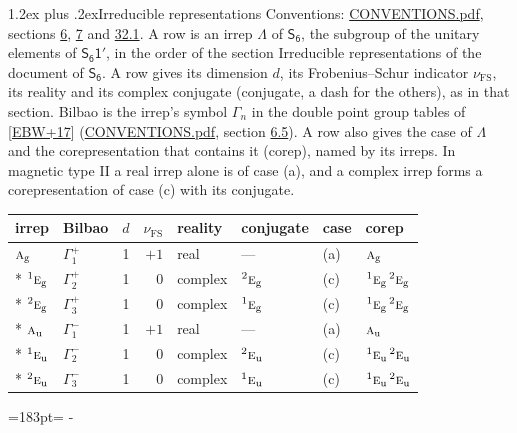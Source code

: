 \documentclass[10pt,a4paper]{article}
\makeatletter
\renewcommand\section{\@startsection{section}{1}{\z@}{-3ex plus -1ex minus -.2ex}%
  {1.2ex plus .2ex}{\normalfont\large\sffamily\bfseries\color{parttitle}}}
\newcommand{\needspace}[1]{\par\penalty-100\begingroup\dimen0=#1\relax\dimen2=\pagegoal
  \advance\dimen2-\pagetotal\ifdim\dimen0>\dimen2\relax\ifdim\dimen2>0pt\vfil\break\fi\fi
  \endgroup}
\numberwithin{equation}{section}
\newcommand{\grp}[1]{\mathsf{#1}}
\newcommand{\irr}[1]{\text{\normalfont\scshape #1}}
\newcommand{\conjpair}[1]{{}^{#1}}
\newcommand{\ptag}[1]{\mathrm{#1}}
\newcommand{\fsind}{\nu_{\mathrm{FS}}}
\makeatother
\begin{document}
\section{Irreducible representations}\label{s:irreps}
Conventions: \href{../../CONVENTIONS.pdf}{CONVENTIONS.pdf}, sections \href{../../../rotation/CONVENTIONS.pdf\#conv.6}{6}, \href{../../../rotation/CONVENTIONS.pdf\#conv.7}{7} and \href{../../CONVENTIONS.pdf\#conv.32.1}{32.1}.
\leavevmode\label{n:irrep.Delta}A row is an irrep $\Lambda$ of $\grp{S_{6}}$, the subgroup of the unitary elements of $\grp{S_{6}1'}$, in the order of the section Irreducible representations of the document of \href{../../../rotation/data/pdf/S6.pdf}{$\grp{S_{6}}$}. \label{n:index.dimension}\label{n:index.frobenius}\label{n:head.irrep}\label{n:head.reality}\label{n:head.conjugate}A row gives its dimension $d$, its Frobenius--Schur indicator $\fsind$, its reality and its complex conjugate (conjugate, a dash for the others), as in that section. \label{n:head.bilbao}\label{n:irrep.alias.gamma}Bilbao is the irrep's symbol $\Gamma_n$ in the double point group tables of [\href{../../../REFERENCES.pdf\#ref.EBW+17}{EBW+17}] (\href{../../CONVENTIONS.pdf}{CONVENTIONS.pdf}, section \href{../../../rotation/CONVENTIONS.pdf\#conv.6.5}{6.5}). \label{n:head.case.corep}\label{n:head.corep}A row also gives the case of $\Lambda$ and the corepresentation that contains it (corep), named by its irreps. In magnetic type II a real irrep alone is of case (a), and a complex irrep forms a corepresentation of case (c) with its conjugate.
\setlength{\emergencystretch}{2em}\par\setlength{\emergencystretch}{0pt}
{\small\renewcommand{\arraystretch}{1.25}\setlength{\tabcolsep}{4pt}\begin{longtable}{@{}llrrllll@{}}\toprule
irrep & Bilbao & $d$ & $\fsind$ & reality & conjugate & case & corep\\\midrule\endhead
\bottomrule\endfoot\endlastfoot
$\irr{a}_{\ptag{g}}$ & $\Gamma_{1}^{+}$ & 1 & $+1$ & real & --- & (a) & $\irr{a}_{\ptag{g}}$\\*
$\conjpair{1}\irr{e}_{\ptag{g}}$ & $\Gamma_{2}^{+}$ & 1 & $0$ & complex & $\conjpair{2}\irr{e}_{\ptag{g}}$ & (c) & $\conjpair{1}\irr{e}_{\ptag{g}}\,\conjpair{2}\irr{e}_{\ptag{g}}$\\*
$\conjpair{2}\irr{e}_{\ptag{g}}$ & $\Gamma_{3}^{+}$ & 1 & $0$ & complex & $\conjpair{1}\irr{e}_{\ptag{g}}$ & (c) & $\conjpair{1}\irr{e}_{\ptag{g}}\,\conjpair{2}\irr{e}_{\ptag{g}}$\\*
$\irr{a}_{\ptag{u}}$ & $\Gamma_{1}^{-}$ & 1 & $+1$ & real & --- & (a) & $\irr{a}_{\ptag{u}}$\\*
$\conjpair{1}\irr{e}_{\ptag{u}}$ & $\Gamma_{2}^{-}$ & 1 & $0$ & complex & $\conjpair{2}\irr{e}_{\ptag{u}}$ & (c) & $\conjpair{1}\irr{e}_{\ptag{u}}\,\conjpair{2}\irr{e}_{\ptag{u}}$\\*
$\conjpair{2}\irr{e}_{\ptag{u}}$ & $\Gamma_{3}^{-}$ & 1 & $0$ & complex & $\conjpair{1}\irr{e}_{\ptag{u}}$ & (c) & $\conjpair{1}\irr{e}_{\ptag{u}}\,\conjpair{2}\irr{e}_{\ptag{u}}$\\
\bottomrule\end{longtable}}
\needspace{183pt}
\end{document}
